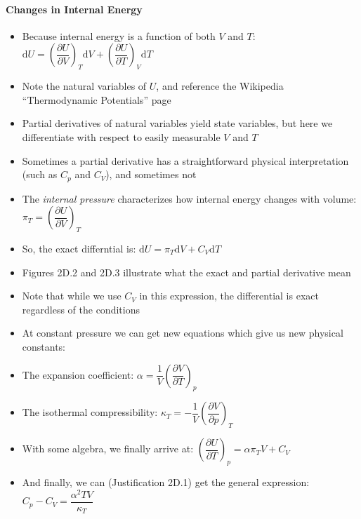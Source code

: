 \documentclass[12pt, openany, letterpaper]{memoir}
\begin{document}
\paragraph{Changes in Internal Energy}
\begin{itemize}
	\item Because internal energy is a function of both $V$ and $T$: $\mathrm{d}U = \left(\dfrac{\partial U}{\partial V}\right)_T\mathrm{d}V + \left(\dfrac{\partial U}{\partial T}\right)_V\mathrm{d}T$
	\item Note the natural variables of $U$, and reference the Wikipedia ``Thermodynamic Potentials'' page
	\item Partial derivatives of natural variables yield state variables, but here we differentiate with respect to easily measurable $V$ and $T$
	\item Sometimes a partial derivative has a straightforward physical interpretation (such as $C_p$ and $C_V$), and sometimes not
	\item The \emph{internal pressure} characterizes how internal energy changes with volume: $\pi_T = \left(\dfrac{\partial U}{\partial V}\right)_T$
	\item So, the exact differntial is: $\mathrm{d}U = \pi_T\mathrm{d}V + C_V\mathrm{d}T$
	\item Figures 2D.2 and 2D.3 illustrate what the exact and partial derivative mean
	\item Note that while we use $C_V$ in this expression, the differential is exact regardless of the conditions
	\item At constant pressure we can get new equations which give us new physical constants:
	\item The expansion coefficient: $\alpha = \dfrac{1}{V}\left(\dfrac{\partial V}{\partial T}\right)_p$ 
	\item The isothermal compressibility: $\kappa_T = -\dfrac{1}{V}\left(\dfrac{\partial V}{\partial p}\right)_T$
	\item With some algebra, we finally arrive at: $\left(\dfrac{\partial U}{\partial T}\right)_p = \alpha\pi_T V + C_V$
	\item And finally, we can (Justification 2D.1) get the general expression: $C_p-C_V = \dfrac{\alpha^2 TV}{\kappa_T}$
\end{itemize}
\end{document}
